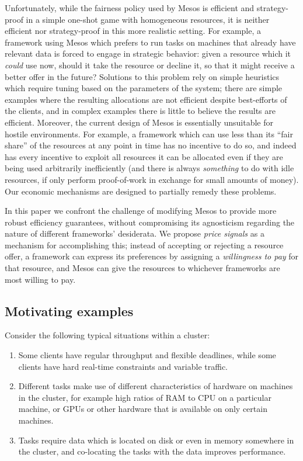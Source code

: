 \documentclass{acm_proc_article-sp}
\begin{document}
Unfortunately, while the fairness policy used by Mesos is efficient and
strategy-proof in a simple one-shot game with homogeneous resources, it is
neither efficient nor strategy-proof in this more realistic setting. 
For example, a framework
using Mesos which prefers to run tasks on machines that already have relevant
data is forced to engage in strategic behavior: given a resource which it
\emph{could} use now, should it take the resource or decline it, so that it
might receive a better offer in the future? Solutions to this problem rely on
simple heuristics which require tuning based on the parameters of the system;
there are simple examples where the resulting allocations are not efficient
despite best-efforts of the clients, and in complex examples there is little to
believe the results are efficient. 
Moreover, the
current design of Mesos is essentially unsuitable for hostile
environments. 
For example,
a framework which can use less than its ``fair share'' of the
resources at any point in time has no incentive to do so, and indeed has every
incentive to exploit all resources it can be allocated even if they are being
used arbitrarily inefficiently (and there is always \emph{something} to do with
idle resources, if only perform proof-of-work in exchange for small amounts of
money).
Our economic mechanisms are designed to partially remedy these problems.

In this paper we confront the challenge of modifying Mesos to provide more
robust efficiency guarantees, without compromising its agnosticism regarding the
nature of different frameworks' desiderata. We propose \emph{price signals} as a
mechanism for accomplishing this; instead of accepting or rejecting a resource
offer, a framework can express its preferences by assigning a \emph{willingness
to pay} for that resource, and Mesos can give the resources to whichever
frameworks are most willing to pay.

\subsection{Motivating examples}\label{examples}

Consider the following typical situations within a cluster:
\begin{enumerate}
  \item Some clients have regular throughput and flexible deadlines, while some
    clients have hard real-time constraints and variable traffic.
  \item Different tasks make use of different characteristics of hardware on
    machines in the cluster, for example high ratios of RAM to CPU on a
    particular machine, or GPUs or other hardware that is available on only
    certain machines.
  \item Tasks require data which is located on disk or even in memory somewhere
    in the cluster, and co-locating the tasks with the data improves
    performance.
\end{enumerate}
\end{document}
